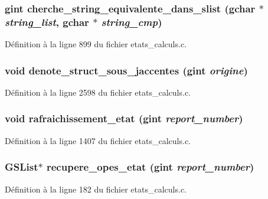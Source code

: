 \subsubsection[{cherche\_\-string\_\-equivalente\_\-dans\_\-slist}]{\setlength{\rightskip}{0pt plus 5cm}gint cherche\_\-string\_\-equivalente\_\-dans\_\-slist (gchar $\ast$ {\em string\_\-list}, \/  gchar $\ast$ {\em string\_\-cmp})}\label{etats__calculs_8h_a7be57203bd852c1d3aac7757b1aa17a4}


Définition à la ligne 899 du fichier etats\_\-calculs.c.

\subsubsection[{denote\_\-struct\_\-sous\_\-jaccentes}]{\setlength{\rightskip}{0pt plus 5cm}void denote\_\-struct\_\-sous\_\-jaccentes (gint {\em origine})}\label{etats__calculs_8h_aee4743be9053aa59db3595cbdf36df36}


Définition à la ligne 2598 du fichier etats\_\-calculs.c.

\subsubsection[{rafraichissement\_\-etat}]{\setlength{\rightskip}{0pt plus 5cm}void rafraichissement\_\-etat (gint {\em report\_\-number})}\label{etats__calculs_8h_ad2852216e5f8cba23c06865a85cc9bac}


Définition à la ligne 1407 du fichier etats\_\-calculs.c.

\subsubsection[{recupere\_\-opes\_\-etat}]{\setlength{\rightskip}{0pt plus 5cm}GSList$\ast$ recupere\_\-opes\_\-etat (gint {\em report\_\-number})}\label{etats__calculs_8h_afbec2d5bda4c558e44362eeaa0ed847e}


Définition à la ligne 182 du fichier etats\_\-calculs.c.

